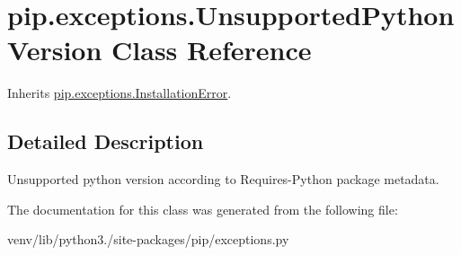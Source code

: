 \hypertarget{classpip_1_1exceptions_1_1_unsupported_python_version}{}\section{pip.\+exceptions.\+Unsupported\+Python\+Version Class Reference}
\label{classpip_1_1exceptions_1_1_unsupported_python_version}


Inherits \hyperlink{classpip_1_1exceptions_1_1_installation_error}{pip.\+exceptions.\+Installation\+Error}.



\subsection{Detailed Description}
\begin{DoxyVerb}Unsupported python version according to Requires-Python package
metadata.\end{DoxyVerb}
 

The documentation for this class was generated from the following file\+:\begin{DoxyCompactItemize}
\item 
venv/lib/python3./site-\/packages/pip/exceptions.\+py\end{DoxyCompactItemize}
